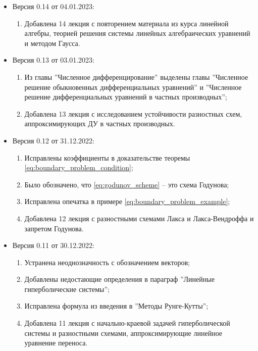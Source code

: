 \documentclass{article}
\begin{document}
\begin{itemize}[nosep]
\item Версия 0.14 от 04.01.2023:
	\begin{enumerate}[nosep]
		\item Добавлена 14 лекция с повторением материала из курса
			линейной алгебры, теорией решения системы линейных
			алгебраических уравнений и методом Гаусса.
	\end{enumerate}
\item Версия 0.13 от 03.01.2023:
	\begin{enumerate}[nosep]
		\item Из главы ''Численное дифференцирование'' выделены главы
			''Численное решение обыкновенных дифференциальных
			уравнений'' и ''Численное решение дифференциальных
			уравнений в частных производных'';
		\item Добавлена 13 лекция с исследованием устойчивости
			разностных схем, аппроксимирующих ДУ в частных
			производных.
	\end{enumerate}
\item Версия 0.12 от 31.12.2022:
	\begin{enumerate}[nosep]
		\item Исправлены коэффициенты в доказательстве теоремы
			\eqref{eq:boundary_problem_condition};
		\item Было обозначено, что \eqref{eq:godunov_scheme} -- это
			схема Годунова;
		\item Исправлена опечатка в примере
			\eqref{eq:boundary_problem_example};
		\item Добавлена 12 лекция с разностными схемами Лакса и
			Лакса-Вендроффа и запретом Годунова.
	\end{enumerate}

\item Версия 0.11 от 30.12.2022:
	\begin{enumerate}[nosep]
		\item Устранена неоднозначность с обозначением векторов;
		\item Добавлены недостающие определения в параграф
			''Линейные гиперболические системы'';
		\item Исправлена формула из введения в ''Методы Рунге-Кутты'';
		\item Добавлена 11 лекция с начально-краевой задачей
			гиперболической системы и разностными схемами,
			аппроксимирующие линейное уравнение переноса.
	\end{enumerate}
\end{itemize}
\end{document}
